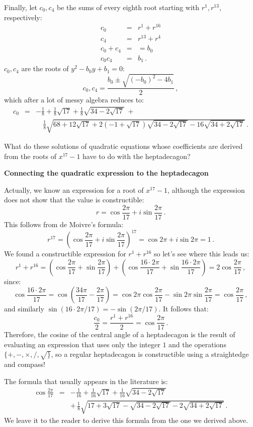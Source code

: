 \documentclass[a4paper,11pt]{article}
\newcommand*{\disfrac}[2]{\displaystyle\frac{#1}{#2}}
\begin{document}
Finally, let $c_0,c_4$ be the sums of every eighth root starting with $r^1,r^{13}$, respectively:
\begin{eqnarray*}
c_0&=&r^1+r^{16}\\
c_4&=&r^{13}+r^4\\
c_0+c_4&=&=b_0\\
c_0c_4&=&b_1\,.
\end{eqnarray*}
$c_0,c_4$ are the roots of $y^2-b_0y+b_1=0$:
\[
c_0,c_4=\frac{b_0\pm\sqrt{(-b_0)^2-4b_1}}{2}\,,
\]
which after a lot of messy algebra reduces to:
\begin{eqnarray*}
c_0&=&-\disfrac{1}{8}+\disfrac{1}{8}\sqrt{17} + 
     \disfrac{1}{8}\sqrt{34-2\sqrt{17}}\; +\\
 &\;\;& \quad\disfrac{1}{8}\sqrt{
     68+12\sqrt{17} + 
     2(-1+\sqrt{17})\sqrt{34-2\sqrt{17}}
   -16
     \sqrt{34+2\sqrt{17}}
   }\,.
\end{eqnarray*}

What do these solutions of quadratic equations whose coefficients are derived from the roots of $x^{17}-1$ have to do with the heptadecagon?

\textbf{Connecting the quadratic expression to the heptadecagon}

Actually, we know an expression for a root of $x^{17}-1$, although the expression does not show that the value is constructible:
\[
r=\cos \frac{2 \pi}{17}+i \sin \frac{2\pi}{17}\,.
\]
This follows from de Moivre's formula:
\[
r^{17}=\left(\cos \frac{2 \pi}{17}+i \sin \frac{2\pi}{17}\right)^{17}=
\cos 2 \pi+i \sin 2\pi=1\,.
\]
We found a constructible expression for $r^1+r^{16}$ so let's see where this leads us:
\[
r^1+r^{16} =\left(\cos \frac{2 \pi}{17}+\sin \frac{2\pi}{17}\right)+
\left(\cos \frac {16 \cdot 2 \pi}{17}+\sin \frac{16 \cdot 2\pi}{17}\right)=
2\cos\frac{2 \pi}{17}\,,
\]
since:
\[
\cos\frac{16\cdot 2\pi}{17}=
\cos\left(\frac{34\pi}{17}-\frac{2\pi}{17}\right)=
\cos 2\pi \cos \frac{2\pi}{17} - \sin 2\pi\sin \frac{2\pi}{17}=
\cos\frac{ 2\pi}{17}\,,
\]
and similarly 
$\sin (16\cdot 2\pi/17)=-\sin (2\pi/17)$.
It follows that:
\[
\frac{c_0}{2}=\frac{r^1+r^{16}}{2} = \cos\frac{2 \pi}{17}\,.
\]
Therefore, the cosine of the central angle of a heptadecagon is the result of evaluating an expression that uses only the integer $1$ and the operations $\{+,-,\times,/,\surd\}$, so a regular heptadecagon is constructible using a straightedge and compass!

The formula that usually appears in the literature is:
\begin{eqnarray*}
\cos\frac{2\pi}{17}
&=&-\frac{1}{16}+\frac{1}{16}\sqrt{17} + 
     \frac{1}{16}\sqrt{34-2\sqrt{17}}\\
&&+\,\frac{1}{8}\sqrt{
     17+3\sqrt{17} - 
     \sqrt{34-2\sqrt{17}}
   -2
     \sqrt{34+2\sqrt{17}}
   }\,.
\end{eqnarray*}
We leave it to the reader to derive this formula from the one we derived above.
\end{document}
